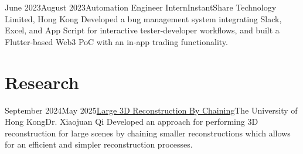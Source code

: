 \documentclass{cv}
\begin{document}
    \begin{employment}{June 2023}{August 2023}{Automation Engineer Intern}{InstantShare Technology Limited, Hong Kong}
        Developed a bug management system integrating Slack, Excel, and App Script for interactive tester-developer workflows, and built a Flutter-based Web3 PoC with an in-app trading functionality.
	\end{employment}
	\vspace{-0.2in}

%
%
%
	
	\section*{Research}
	\begin{research_exp}{September 2024}{May 2025}{\href{https://github.com/Nepranal/chained-reconstructions}{Large 3D Reconstruction By Chaining}}{The University of Hong Kong}{Dr. Xiaojuan Qi}
        Developed an approach for performing 3D reconstruction for large scenes by chaining smaller reconstructions which allows for an efficient and simpler reconstruction processes.
	\end{research_exp}
    \vspace{-0.2in}
	
\end{document}
